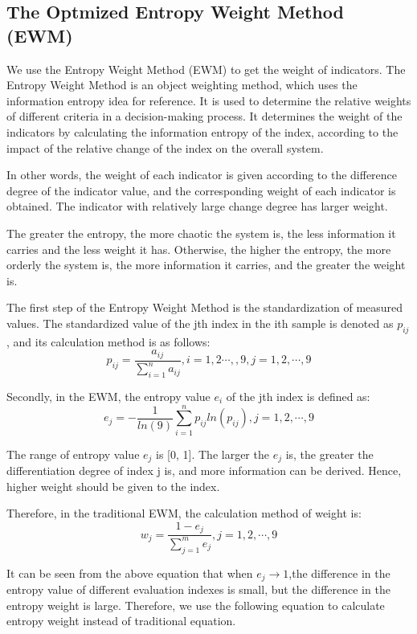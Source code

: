 \MinParskip{}

\subsection{The Optmized Entropy Weight Method (EWM) }
We use the Entropy Weight Method (EWM) to get the weight of indicators. The Entropy Weight Method is an object weighting method, which uses the information entropy idea for reference. It is used to determine the relative weights of different criteria in a decision-making process. It determines the weight of the indicators by calculating the information entropy of the index, according to the impact of the relative change of the index on the overall system.

In other words, the weight of each indicator is given according to the difference degree of the indicator value, and the corresponding weight of each indicator is obtained. The indicator with relatively large change degree has larger weight. 

The greater the entropy, the more chaotic the system is, the less information it carries and the less weight it has. Otherwise, the higher the entropy, the more orderly the system is, the more information it carries, and the greater the weight is.

The first step of the Entropy Weight Method is the standardization of measured values. The standardized value of the jth index in the ith sample is denoted as $p_{ij}$, and its calculation method is as follows:$$p_{ij}=\frac{a_{ij}}{\sum_{i=1}^na_{ij}},i=1,2\cdots,,9,j=1,2,\cdots,9$$

Secondly, in the EWM, the entropy value $e_i$ of the jth index is defined as:$$e_j=-\frac{1}{ln(9)}\sum_{i=1}^np_{ij}ln(p_{ij}),j=1,2,\cdots,9$$

The range of entropy value $e_j$ is [0, 1]. The larger the $e_j$ is, the greater the differentiation degree of index j is, and more information can be derived. Hence, higher weight should be given to the index. 

Therefore, in the traditional EWM, the calculation method of weight is:$$w_j=\frac{1-e_j}{\sum_{j=1}^me_j},j=1,2,\cdots,9$$

It can be seen from the above equation that when $e_j\rightarrow1$,the difference in the entropy value of different evaluation indexes is small, but the difference in the entropy weight is large. Therefore, we use the following equation to calculate entropy weight instead of traditional equation.

